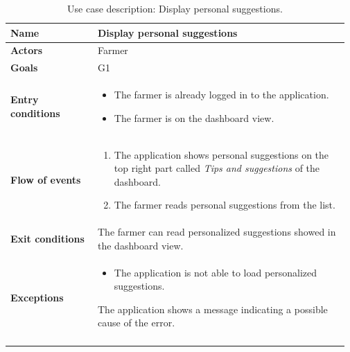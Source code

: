 \begin{longtable}{@{}p{0.25\linewidth} p{0.72\linewidth}@{}}
\toprule
	\textbf{Name}               & Display personal suggestions\\
	\midrule
	\textbf{Actors}             & Farmer\\
	\midrule
	\textbf{Goals}              & G1 \\
	\midrule
	
	\textbf{Entry conditions}   & \begin{itemize}[leftmargin=.4cm,noitemsep,topsep=0pt,before=\vspace{-3mm},after=\vspace{-4mm}]
	    \item The farmer is already logged in to the application.
	    \item The farmer is on the dashboard view.
	\end{itemize}\\
	\midrule
	
	\textbf{Flow of events}     & \begin{enumerate}[leftmargin=.4cm,noitemsep,topsep=0pt,before=\vspace{-3mm},after=\vspace{-4mm}]
	    \item The application shows personal suggestions on the top right part called \textit{Tips and suggestions} of the dashboard.
	    \item The farmer reads personal suggestions from the list.
	\end{enumerate}\\
	\midrule
	\textbf{Exit conditions}    & The farmer can read personalized suggestions showed in the dashboard view. \\
	\midrule
	
	\textbf{Exceptions}         & 
    \begin{itemize}[leftmargin=.4cm,noitemsep,topsep=0pt,before=\vspace{-3mm}]
	   \item The application is not able to load personalized suggestions.
	\end{itemize}
	The application shows a message indicating a possible cause of the error.
	\\\bottomrule
	\caption{Use case description: Display personal suggestions.} 
\end{longtable}


		
